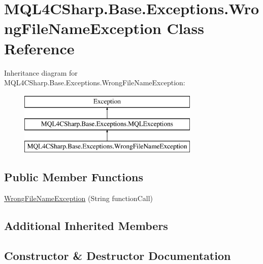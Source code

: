\hypertarget{class_m_q_l4_c_sharp_1_1_base_1_1_exceptions_1_1_wrong_file_name_exception}{}\section{M\+Q\+L4\+C\+Sharp.\+Base.\+Exceptions.\+Wrong\+File\+Name\+Exception Class Reference}
\label{class_m_q_l4_c_sharp_1_1_base_1_1_exceptions_1_1_wrong_file_name_exception}
Inheritance diagram for M\+Q\+L4\+C\+Sharp.\+Base.\+Exceptions.\+Wrong\+File\+Name\+Exception\+:\begin{figure}[H]
\begin{center}
\leavevmode
\includegraphics[height=3.000000cm]{class_m_q_l4_c_sharp_1_1_base_1_1_exceptions_1_1_wrong_file_name_exception}
\end{center}
\end{figure}
\subsection*{Public Member Functions}
\begin{DoxyCompactItemize}
\item 
\hyperlink{class_m_q_l4_c_sharp_1_1_base_1_1_exceptions_1_1_wrong_file_name_exception_a5a5e9ee6640d9ea59aeb3612947f5ec9}{Wrong\+File\+Name\+Exception} (String function\+Call)
\end{DoxyCompactItemize}
\subsection*{Additional Inherited Members}


\subsection{Constructor \& Destructor Documentation}
